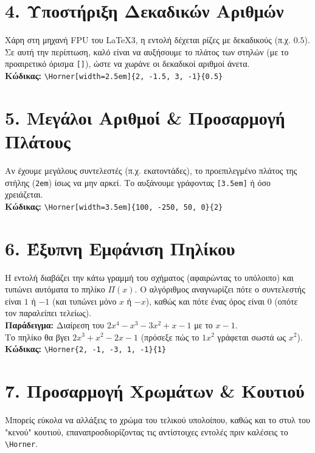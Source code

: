 \documentclass{article}
\begin{document}
\vspace{0.5cm}

\section*{4. Υποστήριξη Δεκαδικών Αριθμών}
Χάρη στη μηχανή FPU του \LaTeX3, η εντολή δέχεται ρίζες με δεκαδικούς (π.χ. $0.5$). Σε αυτή την περίπτωση, καλό είναι να αυξήσουμε το πλάτος των στηλών (με το προαιρετικό όρισμα \texttt{[]}), ώστε να χωράνε οι δεκαδικοί αριθμοί άνετα. \\
\textbf{Κώδικας:} \verb|\Horner[width=2.5em]{2, -1.5, 3, -1}{0.5}| \\

\vspace{0.5cm}

\section*{5. Μεγάλοι Αριθμοί \& Προσαρμογή Πλάτους}
Αν έχουμε μεγάλους συντελεστές (π.χ. εκατοντάδες), το προεπιλεγμένο πλάτος της στήλης (\texttt{2em}) ίσως να μην αρκεί. Το αυξάνουμε γράφοντας \texttt{[3.5em]} ή όσο χρειάζεται. \\
\textbf{Κώδικας:} \verb|\Horner[width=3.5em]{100, -250, 50, 0}{2}| \\

\section*{6. Έξυπνη Εμφάνιση Πηλίκου}
Η εντολή διαβάζει την κάτω γραμμή του σχήματος (αφαιρώντας το υπόλοιπο) και τυπώνει αυτόματα το πηλίκο $\Pi(x)$. Ο αλγόριθμος αναγνωρίζει πότε ο συντελεστής είναι $1$ ή $-1$ (και τυπώνει μόνο $x$ ή $-x$), καθώς και πότε ένας όρος είναι $0$ (οπότε τον παραλείπει τελείως). \\
\textbf{Παράδειγμα:} Διαίρεση του $2x^4 - x^3 - 3x^2 + x - 1$ με το $x - 1$. \\
Το πηλίκο θα βγει $2x^3 + x^2 - 2x - 1$ (πρόσεξε πώς το $1x^2$ γράφεται σωστά ως $x^2$). \\
\textbf{Κώδικας:} \verb|\Horner{2, -1, -3, 1, -1}{1}| \\

\vspace{0.5cm}

\section*{7. Προσαρμογή Χρωμάτων \& Κουτιού}
Μπορείς εύκολα να αλλάξεις το χρώμα του τελικού υπολοίπου, καθώς και το στυλ του "κενού" κουτιού, επαναπροσδιορίζοντας τις αντίστοιχες εντολές πριν καλέσεις το \verb|\Horner|.
\end{document}
